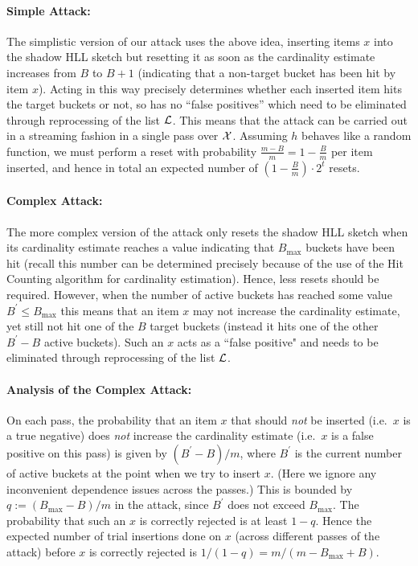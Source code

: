 \documentclass{article}
\begin{document}
\paragraph{Simple Attack:}
The simplistic version of our attack uses the above idea, inserting items $x$ into the shadow HLL sketch but resetting it as soon as the cardinality estimate increases from $B$ to $B+1$ (indicating that a non-target bucket has been hit by item $x$). Acting in this way precisely determines whether each inserted item hits the target buckets or not, so has no ``false positives'' which need to be eliminated through reprocessing of the list ${\cal L}$. This means that the attack can be carried out in a streaming fashion in a single pass over ${\cal X}$. Assuming $h$ behaves like a random function, we must perform a reset with probability $\frac{m-B}{m} = 1 - \frac{B}{m}$ per item inserted, and hence in total an expected number of $(1 - \frac{B}{m})\cdot 2^t$ resets.

\paragraph{Complex Attack:}
The more complex version of the attack only resets the shadow HLL sketch when its cardinality estimate reaches a value indicating that $B_{\max}$ buckets have been hit (recall this number can be determined precisely because of the use of the Hit Counting algorithm for cardinality estimation). Hence, less resets should be required. However, when the number of active buckets has reached some value $B^\prime \leq B_{\max}$ this means that an item $x$ may not increase the cardinality estimate, yet still not hit one of the $B$ target buckets (instead it hits one of the other $B^\prime - B$ active buckets). Such an $x$ acts as a ``false positive" and needs to be eliminated through reprocessing of the list ${\cal L}$.

\paragraph{Analysis of the Complex Attack:}
On each pass, the probability that an item $x$ that should \emph{not} be inserted (i.e.\ $x$ is a true negative) does \emph{not} increase the cardinality estimate (i.e.\ $x$ is a false positive on this pass) is given by $(B^\prime - B)/m$, where $B^\prime$ is the current number of active buckets at the point when we try to insert $x$. (Here we ignore any inconvenient dependence issues across the passes.) This is bounded by $q := (B_{\max} - B)/m$ in the attack, since $B^\prime$ does not exceed $B_{\max}$. The probability that such an $x$ is correctly rejected is at least $1-q$. Hence the expected number of trial insertions done on $x$ (across different passes of the attack) before $x$ is correctly rejected is $1/(1-q) = m/(m - B_{\max} + B)$. 
\end{document}
